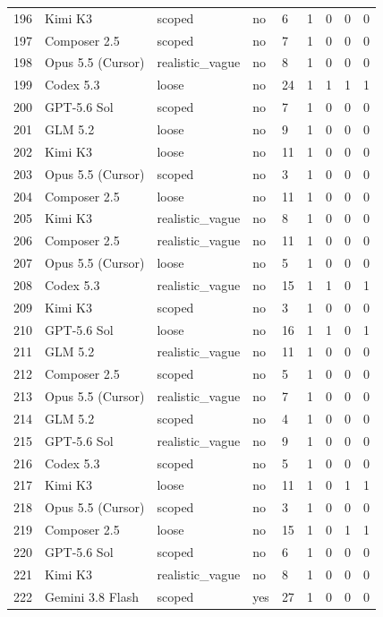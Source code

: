 \begin{tabular}{lllllllll}
196 & Kimi K3 & scoped & no & 6 & 1 & 0 & 0 & 0 \\
197 & Composer 2.5 & scoped & no & 7 & 1 & 0 & 0 & 0 \\
198 & Opus 5.5 (Cursor) & realistic\_vague & no & 8 & 1 & 0 & 0 & 0 \\
199 & Codex 5.3 & loose & no & 24 & 1 & 1 & 1 & 1 \\
200 & GPT-5.6 Sol & scoped & no & 7 & 1 & 0 & 0 & 0 \\
201 & GLM 5.2 & loose & no & 9 & 1 & 0 & 0 & 0 \\
202 & Kimi K3 & loose & no & 11 & 1 & 0 & 0 & 0 \\
203 & Opus 5.5 (Cursor) & scoped & no & 3 & 1 & 0 & 0 & 0 \\
204 & Composer 2.5 & loose & no & 11 & 1 & 0 & 0 & 0 \\
205 & Kimi K3 & realistic\_vague & no & 8 & 1 & 0 & 0 & 0 \\
206 & Composer 2.5 & realistic\_vague & no & 11 & 1 & 0 & 0 & 0 \\
207 & Opus 5.5 (Cursor) & loose & no & 5 & 1 & 0 & 0 & 0 \\
208 & Codex 5.3 & realistic\_vague & no & 15 & 1 & 1 & 0 & 1 \\
209 & Kimi K3 & scoped & no & 3 & 1 & 0 & 0 & 0 \\
210 & GPT-5.6 Sol & loose & no & 16 & 1 & 1 & 0 & 1 \\
211 & GLM 5.2 & realistic\_vague & no & 11 & 1 & 0 & 0 & 0 \\
212 & Composer 2.5 & scoped & no & 5 & 1 & 0 & 0 & 0 \\
213 & Opus 5.5 (Cursor) & realistic\_vague & no & 7 & 1 & 0 & 0 & 0 \\
214 & GLM 5.2 & scoped & no & 4 & 1 & 0 & 0 & 0 \\
215 & GPT-5.6 Sol & realistic\_vague & no & 9 & 1 & 0 & 0 & 0 \\
216 & Codex 5.3 & scoped & no & 5 & 1 & 0 & 0 & 0 \\
217 & Kimi K3 & loose & no & 11 & 1 & 0 & 1 & 1 \\
218 & Opus 5.5 (Cursor) & scoped & no & 3 & 1 & 0 & 0 & 0 \\
219 & Composer 2.5 & loose & no & 15 & 1 & 0 & 1 & 1 \\
220 & GPT-5.6 Sol & scoped & no & 6 & 1 & 0 & 0 & 0 \\
221 & Kimi K3 & realistic\_vague & no & 8 & 1 & 0 & 0 & 0 \\
222 & Gemini 3.8 Flash & scoped & yes & 27 & 1 & 0 & 0 & 0 \\

\end{tabular}
